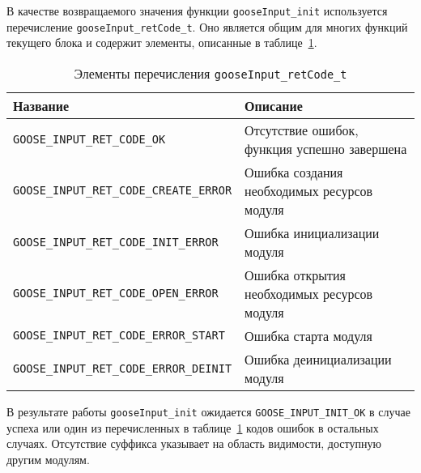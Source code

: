 В качестве возвращаемого значения функции \lstinline{gooseInput_init}
используется перечисление \lstinline{gooseInput_retCode_t}. Оно является общим
для многих функций текущего блока и содержит элементы, описанные
в таблице~\ref{table:func:gooseInputRetCodeElems}.

\begin{table}[ht]
    \caption{Элементы перечисления \lstinline{gooseInput_retCode_t}}
    \label{table:func:gooseInputRetCodeElems}
    \begin{tabular}{| >{\raggedright}m{}
                    | >{\raggedright\arraybackslash}m{}|}
        \hline
        \centering Название & \centering\arraybackslash Описание \\

        \hline
        \lstinline[]$GOOSE_INPUT_RET_CODE_OK$ &
        Отсутствие ошибок, функция успешно завершена
        \\

        \hline
        \lstinline[]$GOOSE_INPUT_RET_CODE_CREATE_ERROR$ &
        Ошибка создания необходимых ресурсов модуля
        \\

        \hline
        \lstinline[]$GOOSE_INPUT_RET_CODE_INIT_ERROR$ &
        Ошибка инициализации модуля
        \\

        \hline
        \lstinline[]$GOOSE_INPUT_RET_CODE_OPEN_ERROR$ &
        Ошибка открытия необходимых ресурсов модуля
        \\

        \hline
        \lstinline[]$GOOSE_INPUT_RET_CODE_ERROR_START$ &
        Ошибка старта модуля
        \\

        \hline
        \lstinline[]$GOOSE_INPUT_RET_CODE_ERROR_DEINIT$ &
        Ошибка деинициализации модуля
        \\

        \hline
    \end{tabular}
\end{table}

В результате работы \lstinline{gooseInput_init} ожидается
\lstinline{GOOSE_INPUT_INIT_OK} в случае успеха или один из перечисленных
в таблице~\ref{table:func:gooseInputRetCodeElems} кодов ошибок в остальных
случаях.
Отсутствие суффикса указывает на область видимости, доступную другим модулям.

